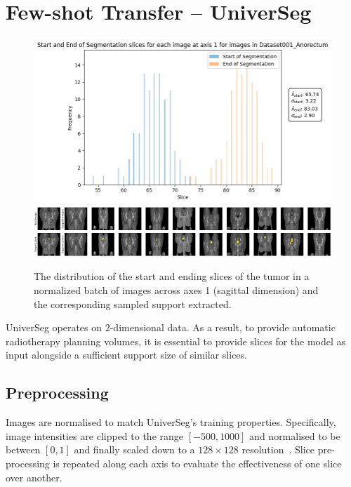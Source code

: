 \documentclass[12pt,twoside]{report}
\begin{document}
\section{Few-shot Transfer -- UniverSeg}

\begin{figure}
  \centering
  \includegraphics[width=.8\linewidth]{../../research/source/code/UniverSeg/start_end_distribution_axis_1_anorectum.png}
  \includegraphics[width=\linewidth, trim=0 0 340px 0, clip]{../../research/source/code/UniverSeg/support_anorectum_axis_1.png}
  \caption{The distribution of the start and ending slices of the tumor in a normalized batch of images across axes 1 (sagittal dimension) and the corresponding sampled support extracted.}\label{fig:start-end-distribution-universeg}
\end{figure}

UniverSeg operates on 2-dimensional data. As a result, to provide automatic radiotherapy planning volumes, it is essential to provide slices for the model as input alongside a sufficient support size of similar slices. 

\subsection{Preprocessing}

Images are normalised to match UniverSeg's training properties. Specifically, image intensities are clipped to the range $[-500, 1000]$ and normalised to be between $[0,1]$ and finally scaled down to a $128 \times 128$ resolution~\cite{universeg}. Slice pre-processing is repeated along each axis to evaluate the effectiveness of one slice over another. 
\end{document}
